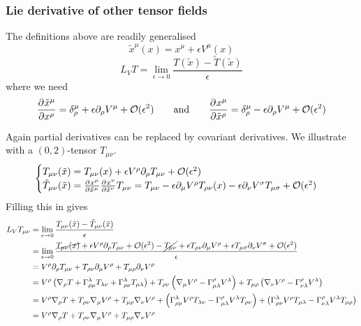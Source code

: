 \subsubsection{Lie derivative of other tensor fields}
The definitions above are readily generalised
\[ \tilde{x}^\mu(x) = x^\mu +\epsilon V^\mu(x) \]
\[ L_VT = \lim_{\epsilon\to 0} \frac{T(\tilde{x})-\tilde{T}(\tilde{x})}{\epsilon} \]
where we need
\[  \frac{\partial{^{}}\tilde{x}^\mu}{\partial{{x^\rho}^{}}}  = \delta^\mu_\rho + \epsilon \partial_\rho V^\mu + \mathcal{O}(\epsilon^2) \qquad \text{and}\qquad  \frac{\partial{^{}}x^\mu}{\partial{{\tilde{x}{^\rho}}^{}}}  = \delta^\mu_\rho - \epsilon \partial_\rho V^\mu + \mathcal{O}(\epsilon^2) \]

Again partial derivatives can be replaced by covariant derivatives. We illustrate with a $(0,2)$-tensor $T_{\mu\nu}$.
\[ \begin{cases}
T_{\mu\nu}(\tilde{x}) = T_{\mu\nu}(x) + \epsilon V^\rho\partial_\rho T_{\mu\nu}+ \mathcal{O}(\epsilon^2) \\
\tilde{T}_{\mu\nu}(\tilde{x}) =  \frac{\partial{^{}}x^\mu}{\partial{{\tilde{x}{^\mu}}^{}}}  \frac{\partial{^{}}x^\nu}{\partial{{\tilde{x}{^\nu}}^{}}} T_{\mu\nu} = T_{\mu\nu} - \epsilon\partial_\mu V^\rho T_{\rho\nu}(x) - \epsilon\partial_\nu V^\sigma T_{\mu\sigma} + \mathcal{O}(\epsilon^2)
\end{cases} \]
Filling this in gives
\begin{align}
L_V T_{\mu\nu} &= \lim_{\epsilon\to 0} \frac{T_{\mu\nu}(\tilde{x})-\tilde{T}_{\mu\nu}(\tilde{x})}{\epsilon} \\
&= \lim_{\epsilon\to 0} \frac{\cancel{T_{\mu\nu}(x)}+\epsilon V^\rho\partial_\rho T_{\mu\nu}+ \mathcal{O}(\epsilon^2)-\cancel{T_{\mu\nu}}+\epsilon T_{\rho\nu} \partial_\mu V^\rho +\epsilon T_{\mu\sigma} \partial_\nu V^\sigma + \mathcal{O}(\epsilon^2)}{\epsilon} \\
&= V^\rho\partial_\rho T_{\mu\nu} + T_{\rho\nu} \partial_\mu V^\rho + T_{\mu\rho} \partial_\nu V^\rho \\
&= V^\rho \left(\nabla_\rho T + \Gamma^\lambda_{\rho \mu}T_{\lambda \nu} + \Gamma^\lambda_{\rho \nu}T_{\mu \lambda} \right) + T_{\rho\nu} \left(\nabla_\mu V^\rho - \Gamma^\rho_{\mu\lambda}V^\lambda\right) + T_{\mu\rho} \left(\nabla_\nu V^\rho - \Gamma^\rho_{\nu\lambda}V^\lambda\right) \\
&= V^\rho\nabla_\rho T + T_{\rho\nu}\nabla_\mu V^\rho + T_{\mu\rho}\nabla_\nu V^\rho + \left(\Gamma^\lambda_{\rho \mu}V^\rho T_{\lambda \nu} - \Gamma^\rho_{\mu\lambda}V^\lambda T_{\rho\nu}\right) + \left(\Gamma^\lambda_{\rho \nu}V^\rho T_{\mu \lambda} - \Gamma^\rho_{\nu\lambda}V^\lambda T_{\mu\rho}\right) \\
&= V^\rho\nabla_\rho T + T_{\rho\nu}\nabla_\mu V^\rho + T_{\mu\rho}\nabla_\nu V^\rho
\end{align}

